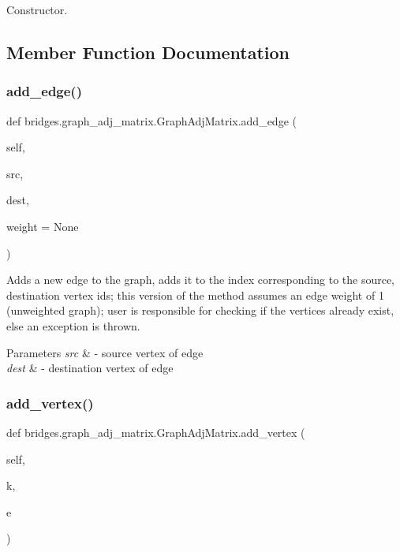 Constructor. 



\subsection{Member Function Documentation}
\mbox{\label{classbridges_1_1graph__adj__matrix_1_1_graph_adj_matrix_aad67dc7b3da58ff67fd807a3455765c1}} 
\subsubsection{\texorpdfstring{add\_edge()}{add\_edge()}}
{\footnotesize\ttfamily def bridges.\+graph\+\_\+adj\+\_\+matrix.\+Graph\+Adj\+Matrix.\+add\+\_\+edge (\begin{DoxyParamCaption}\item[{}]{self,  }\item[{}]{src,  }\item[{}]{dest,  }\item[{}]{weight = {\ttfamily None} }\end{DoxyParamCaption})}



Adds a new edge to the graph, adds it to the index corresponding to the source, destination vertex ids; this version of the method assumes an edge weight of 1 (unweighted graph); user is responsible for checking if the vertices already exist, else an exception is thrown. 


\begin{DoxyParams}{Parameters}
{\em src} & -\/ source vertex of edge \\
\hline
{\em dest} & -\/ destination vertex of edge \\
\hline
\end{DoxyParams}
\mbox{\label{classbridges_1_1graph__adj__matrix_1_1_graph_adj_matrix_aa6fa31ebae643950dd33628269136d00}} 
\subsubsection{\texorpdfstring{add\_vertex()}{add\_vertex()}}
{\footnotesize\ttfamily def bridges.\+graph\+\_\+adj\+\_\+matrix.\+Graph\+Adj\+Matrix.\+add\+\_\+vertex (\begin{DoxyParamCaption}\item[{}]{self,  }\item[{}]{k,  }\item[{}]{e }\end{DoxyParamCaption})}



